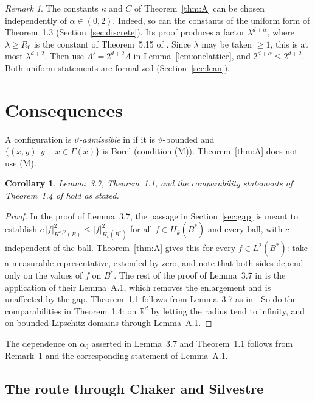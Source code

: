\documentclass[11pt]{amsart}
\newtheorem{corollary}[lemma]{Corollary}
\theoremstyle{remark}
\newtheorem{remark}[lemma]{Remark}
\newcommand{\R}{\mathbb{R}}
\newcommand{\abs}[1]{\lvert #1\rvert}
\newcommand{\1}{\mathbf{1}}
\begin{document}
\begin{remark}\label{rem:alpha}
The constants $\kappa$ and $C$ of Theorem~\ref{thm:A} can be chosen independently of
$\alpha\in(0,2)$. Indeed, so can the constants of the uniform form of Theorem~1.3
(Section~\ref{sec:discrete}). Its proof produces a factor $\lambda^{d+\alpha}$, where $\lambda\ge R_0$
is the constant of Theorem~5.15 of \cite{BKS}. Since $\lambda$ may be taken $\ge1$, this is at most
$\lambda^{d+2}$. Then use $\Lambda'=2^{d+2}\Lambda$ in Lemma~\ref{lem:onelattice}, and
$2^{d+\alpha}\le2^{d+2}$. Both uniform statements are formalized (Section~\ref{sec:lean}).
\end{remark}

\section{Consequences}\label{sec:consequences}

A configuration is \emph{$\vartheta$-admissible} in \cite{BKS} if it is $\vartheta$-bounded and
$\{(x,y):y-x\in\Gamma(x)\}$ is Borel (condition (M)). Theorem~\ref{thm:A} does not use (M).

\begin{corollary}\label{cor:bks}
Lemma~3.7, Theorem~1.1, and the comparability statements of Theorem~1.4 of \cite{BKS} hold as
stated.
\end{corollary}

\begin{proof}
In the proof of Lemma~3.7, the passage in Section~\ref{sec:gap} is meant to establish
$c\,\abs{f}^2_{H^{\alpha/2}(B)}\le\abs{f}^2_{H_k(B^*)}$ for all $f\in H_k(B^*)$ and every ball, with
$c$ independent of the ball. Theorem~\ref{thm:A} gives this for every $f\in L^2(B^*)$: take a
measurable representative, extended by zero, and note that both sides depend only on the values of
$f$ on $B^*$. The rest of the proof of Lemma~3.7 in \cite{BKS} is the application of their
Lemma~A.1, which removes the enlargement and is unaffected by the gap. Theorem~1.1 follows from
Lemma~3.7 as in \cite{BKS}. So do the comparabilities in Theorem~1.4: on $\R^d$ by letting the
radius tend to infinity, and on bounded Lipschitz domains through Lemma~A.1.
\end{proof}

The dependence on $\alpha_0$ asserted in Lemma~3.7 and Theorem~1.1 follows from Remark~\ref{rem:alpha} and the
corresponding statement of Lemma~A.1.

\subsection{The route through Chaker and Silvestre}
\end{document}
